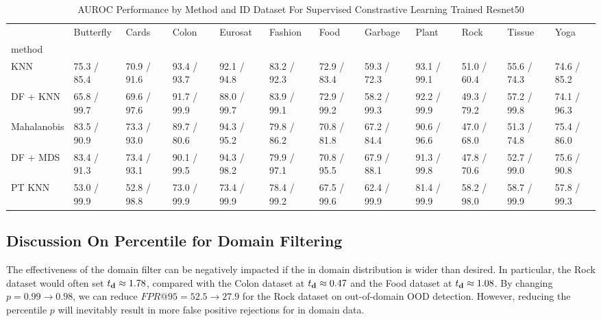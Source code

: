 \documentclass[letterpaper]{article} %
\theoremstyle{plain}
\theoremstyle{definition}
\theoremstyle{remark}
\begin{document}
\begin{sidewaystable}
\caption{AUROC Performance by Method and ID Dataset For Supervised Constrastive Learning Trained Resnet50}


\label{tab:auroc_results_simclr}
\begin{tabular}{llllllllllll}
\toprule
 & Butterfly & Cards & Colon & Eurosat & Fashion & Food & Garbage & Plant & Rock & Tissue & Yoga \\
method &  &  &  &  &  &  &  &  &  &  &  \\
\midrule
KNN & 75.3 / 85.4 & 70.9 / 91.6 & 93.4 / 93.7 & 92.1 / 94.8 & 83.2 / 92.3 & 72.9 / 83.4 & 59.3 / 72.3 & 93.1 / 99.1 & 51.0 / 60.4 & 55.6 / 74.3 & 74.6 / 85.2 \\
DF + KNN & 65.8 / 99.7 & 69.6 / 97.6 & 91.7 / 99.9 & 88.0 / 99.7 & 83.9 / 99.1 & 72.9 / 99.2 & 58.2 / 99.3 & 92.2 / 99.9 & 49.3 / 79.2 & 57.2 / 99.8 & 74.1 / 96.3 \\
Mahalanobis & 83.5 / 90.9 & 73.3 / 93.0 & 89.7 / 80.6 & 94.3 / 95.2 & 79.8 / 86.2 & 70.8 / 81.8 & 67.2 / 84.4 & 90.6 / 96.6 & 47.0 / 68.0 & 51.3 / 74.8 & 75.4 / 86.0 \\
DF + MDS & 83.4 / 91.3 & 73.4 / 93.1 & 90.1 / 99.5 & 94.3 / 98.2 & 79.9 / 97.1 & 70.8 / 95.5 & 67.9 / 88.1 & 91.3 / 99.8 & 47.8 / 70.6 & 52.7 / 99.0 & 75.6 / 90.8 \\
PT KNN & 53.0 / 99.9 & 52.8 / 98.8 & 73.0 / 99.9 & 73.4 / 99.9 & 78.4 / 99.2 & 67.5 / 99.6 & 62.4 / 99.9 & 81.4 / 99.9 & 58.2 / 98.0 & 58.7 / 99.9 & 57.8 / 99.3 \\
\bottomrule
\end{tabular}

\end{sidewaystable}

\subsection{Discussion On Percentile for Domain Filtering}

The effectiveness of the domain filter can be negatively impacted if the in domain distribution is wider than desired. In particular, the Rock dataset \citep{rock_data} would often set $t_{\mathbf{d}} \approx 1.78$, compared with the Colon dataset at $t_{\mathbf{d}} \approx 0.47$ and the Food dataset at $t_{\mathbf{d}} \approx 1.08$. By changing $p=0.99\to0.98$, we can reduce $FPR@95=52.5\to27.9 $ for the Rock dataset on out-of-domain OOD detection. However, reducing the percentile $p$ will inevitably result in more false positive rejections for in domain data. 
\end{document}
